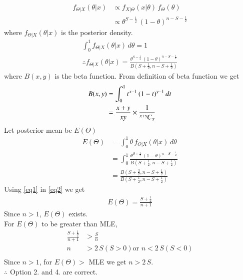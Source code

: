 \documentclass[journal,12pt,twocolumn]{IEEEtran}
\begin{document}
\begin{align}
    f_{\Theta|X}(\theta|x) &\propto f_{X|\Theta}(x|\theta)\, f_\Theta(\theta)\nonumber\\
    &\propto \theta^{S-\frac{1}{2}}\,(1-\theta)^{n-S-\frac{1}{2}}
\end{align}
where $f_{\Theta|X}(\theta|x)$ is the posterior density.
\begin{align}
    \int_0^1 f_{\Theta|X}(\theta|x)\,d\theta = 1\nonumber\\
    \therefore f_{\Theta|X}(\theta|x) = \frac{\theta^{S-\frac{1}{2}}\,(1-\theta)^{n-S-\frac{1}{2}}}{B(S+\frac{1}{2},n-S+\frac{1}{2})}
\end{align}
where $B(x,y)$ is the beta function. From definition of beta function we get
\begin{align}
    B(x,y) &= \int_0^1 t^{x-1}\,(1-t)^{y-1}\,dt\nonumber\\
    &= \frac{x+y}{xy}\times \frac{1}{{{}^{x+y}\mkern-1muC_{x}}}\label{eq1}
\end{align}
Let posterior mean be $E(\Theta)$
\begin{align}
    E(\Theta) &= \int_0^1 \theta\,f_{\Theta|X}(\theta|x)\,d\theta\nonumber\\
    &=\int_0^1 \frac{\theta^{S+\frac{1}{2}}\,(1-\theta)^{n-S-\frac{1}{2}}}{B(S+\frac{1}{2},n-S+\frac{1}{2})}\nonumber\\
    &=\frac{B(S+\frac{3}{2},n-S+\frac{1}{2})}{B(S+\frac{1}{2},n-S+\frac{1}{2})}\label{eq2}
\end{align}
Using \eqref{eq1} in \eqref{eq2} we get
\begin{align}
    E(\Theta) = \frac{S+\frac{1}{2}}{n+1}
\end{align}
Since $n>1$, $E(\Theta)$ exists.\\
For $E(\Theta)$ to be greater than MLE,
\begin{align}
    \frac{S+\frac{1}{2}}{n+1} &> \frac{S}{n}\nonumber\\
     n&>2\,S (S>0) \text{or } n<2\,S (S<0)\\
\end{align}
Since $n>1$, for $E(\Theta) >$  MLE we get $n>2\,S$.\\
$\therefore$ Option 2. and 4. are correct.\\
\end{document}
